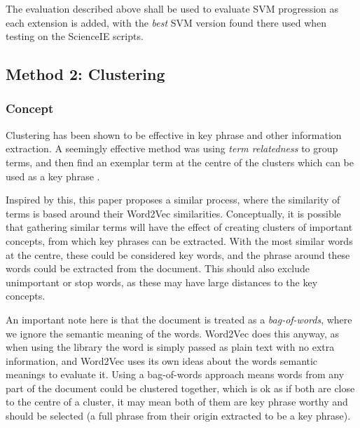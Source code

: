 The evaluation described above shall be used to evaluate SVM progression as each extension is added, with the \textit{best} SVM version found there used when testing on the ScienceIE scripts.

\subsection{Method 2: Clustering}
\subsubsection*{Concept}
Clustering has been shown to be effective in key phrase and other information extraction. A seemingly effective method was using \textit{term relatedness} to group terms, and then find an exemplar term at the centre of the clusters which can be used as a key phrase \cite{Liu2009}. 

Inspired by this, this paper proposes a similar process, where the similarity of terms is based around their Word2Vec similarities. Conceptually, it is possible that gathering similar terms will have the effect of creating clusters of important concepts, from which key phrases can be extracted. With the most similar words at the centre, these could be considered key words, and the phrase around these words could be extracted from the document. This should also exclude unimportant or stop words, as these may have large distances to the key concepts. 

An important note here is that the document is treated as a \textit{bag-of-words}, where we ignore the semantic meaning of the words. Word2Vec does this anyway, as when using the library the word is simply passed as plain text with no extra information, and Word2Vec uses its own ideas about the words semantic meanings to evaluate it. Using a bag-of-words approach means words from any part of the document could be clustered together, which is ok as if both are close to the centre of a cluster, it may mean both of them are key phrase worthy and should be selected (a full phrase from their origin extracted to be a key phrase).

